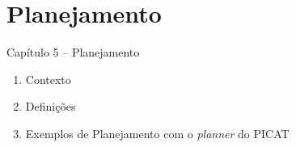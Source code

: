 
\section{Planejamento}
\begin{frame}

\begin{center}
{\huge Capítulo 5 -- Planejamento}



\begin{enumerate}
  \item Contexto
  \item Definições
  \item Exemplos de Planejamento com o \textit{planner} do PICAT
\end{enumerate}

\end{center}

\end{frame}





